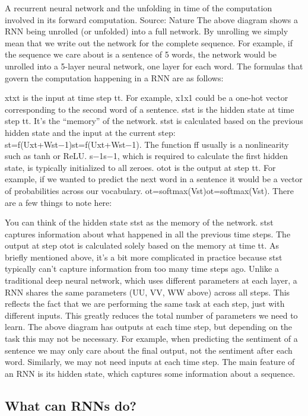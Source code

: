 A recurrent neural network and the unfolding in time of the computation involved in its forward computation. Source: Nature The above diagram shows a RNN being unrolled (or unfolded) into a full network. By unrolling we simply mean that we write out the network for the complete sequence. For example, if the sequence we care about is a sentence of 5 words, the network would be unrolled into a 5-layer neural network, one layer for each word. The formulas that govern the computation happening in a RNN are as follows:

xtxt is the input at time step tt. For example, x1x1 could be a one-hot vector corresponding to the second word of a sentence.
stst is the hidden state at time step tt. It’s the “memory” of the network. stst is calculated based on the previous hidden state and the input at the current step: st=f(Uxt+Wst−1)st=f(Uxt+Wst−1). The function ff usually is a nonlinearity such as tanh or ReLU. s−1s−1, which is required to calculate the first hidden state, is typically initialized to all zeroes.
otot is the output at step tt. For example, if we wanted to predict the next word in a sentence it would be a vector of probabilities across our vocabulary. ot=softmax(Vst)ot=softmax(Vst).
There are a few things to note here:

You can think of the hidden state stst as the memory of the network. stst captures information about what happened in all the previous time steps. The output at step otot is calculated solely based on the memory at time tt. As briefly mentioned above, it’s a bit more complicated in practice because stst typically can’t capture information from too many time steps ago.
Unlike a traditional deep neural network, which uses different parameters at each layer, a RNN shares the same parameters (UU, VV, WW above) across all steps. This reflects the fact that we are performing the same task at each step, just with different inputs. This greatly reduces the total number of parameters we need to learn.
The above diagram has outputs at each time step, but depending on the task this may not be necessary. For example, when predicting the sentiment of a sentence we may only care about the final output, not the sentiment after each word. Similarly, we may not need inputs at each time step. The main feature of an RNN is its hidden state, which captures some information about a sequence.

\subsection{What can RNNs do?}

